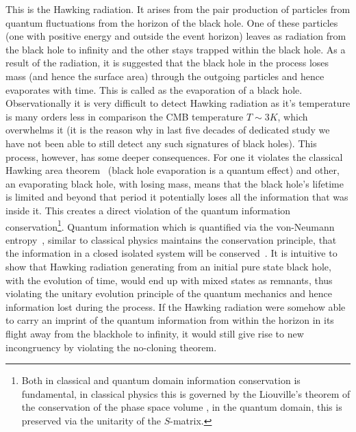\documentclass[fleqn,usenatbib]{mnras}
\begin{document}
This is the Hawking radiation. It arises from the pair production of particles from quantum fluctuations from the horizon of the black hole. One of these particles (one with positive energy and outside the event horizon) leaves as radiation from the black hole to infinity and the other stays trapped within the black hole. As a result of the radiation, it is suggested that the black hole in the process loses mass (and hence the surface area) through the outgoing particles and hence evaporates with time. This is called as the evaporation of a black hole. Observationally it is very difficult to detect Hawking radiation as it's temperature is many orders less in comparison the CMB temperature $T\sim3K$, which overwhelms it (it is the reason why in last five decades of dedicated study we have not been able to still detect any such signatures of black holes).  This process, however, has some deeper consequences. For one it violates the classical Hawking area theorem~\citep{markov1} (black hole evaporation is a quantum effect) and other, an evaporating black hole, with losing mass, means that the black hole's lifetime is limited and beyond that period it potentially loses all the information that was inside it. This creates a direct violation of the quantum information conservation\footnote{Both in classical and quantum domain information conservation is fundamental, in classical physics this is governed by the Liouville's theorem of the conservation of the phase space volume \citep{susskind1}, in the quantum domain, this is preserved via the unitarity of the $S$-matrix.}. Quantum information which is quantified via the von-Neumann entropy~\citep{nc}, similar to classical physics maintains the conservation principle, that the information in a closed isolated system will be conserved~\citep{pati,clone,conserve,conserve2,conserve3}. It is intuitive to show that Hawking radiation generating from an initial pure state black hole, with the evolution of time, would end up with mixed states as remnants, thus violating the unitary evolution principle of the quantum mechanics and hence information lost during the process.   If the Hawking radiation were somehow able to carry an imprint of the quantum information from within the horizon in its flight away from the blackhole to infinity, it would still give rise to new incongruency by violating the no-cloning theorem. 
\end{document}
